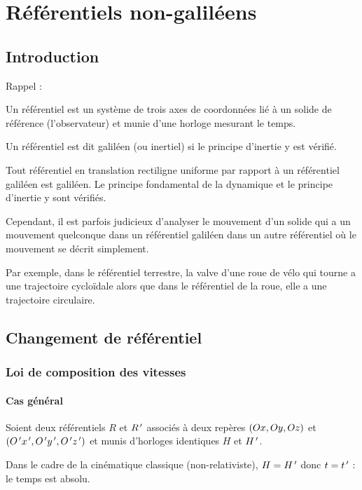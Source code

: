 \chapter{Référentiels non-galiléens}

\minitoc

\section*{Introduction}

Rappel :

Un référentiel est un système de trois axes de coordonnées lié à un solide de référence (l'observateur) et munie d'une horloge mesurant le temps.

Un référentiel est dit galiléen (ou inertiel) si le principe d'inertie y est vérifié.

Tout référentiel en translation rectiligne uniforme par rapport à un référentiel galiléen est galiléen. Le principe fondamental de la dynamique et le principe d'inertie y sont vérifiés.

Cependant, il est parfois judicieux d'analyser le mouvement d'un solide qui a un mouvement quelconque dans un référentiel galiléen dans un autre référentiel où le mouvement se décrit simplement.

Par exemple, dans le référentiel terrestre, la valve d'une roue de vélo qui tourne a une trajectoire cycloïdale alors que dans le référentiel de la roue, elle a une trajectoire circulaire.

\section{Changement de référentiel}

\subsection{Loi de composition des vitesses}

\subsubsection{Cas général}

Soient deux référentiels \(R\) et \(R^{\,\prime}\) associés à deux repères \(\left(Ox,Oy,Oz\right)\) et \(\left(O^{\,\prime} x^{\,\prime},O^{\,\prime} y^{\,\prime},O^{\,\prime} z^{\,\prime}\right)\) et munis d'horloges identiques \(H\) et \(H^{\,\prime}\).

Dans le cadre de la cinématique classique (\ie non-relativiste), \(H=H^{\,\prime}\) donc \(t=t^{\,\prime}\) : le temps est absolu.

